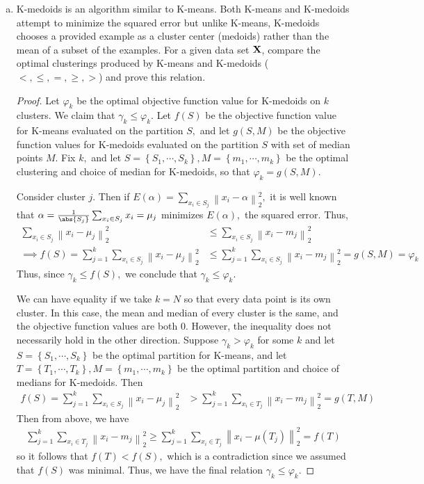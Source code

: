 \documentclass{article}
\newcommand{\X}{{\bf X}}
\begin{document}
\begin{enumerate}[(a)]
		\item K-medoids is an algorithm similar to K-means. Both K-means and K-medoids attempt to minimize the squared error but unlike K-means, K-medoids chooses a provided example as a cluster center (medoids) rather than the mean of a subset of the examples. For a given data set $\X$, compare the optimal clusterings produced by K-means and K-medoids ($<, \le, =, \ge, >$) and prove this relation.
			\begin{proof}
				Let $\varphi_k$ be the optimal objective function value for K-medoids on $k$ clusters. We claim that $\gamma_k\le \varphi_k.$ Let $f(S)$ be the objective function value for K-means evaluated on the partition $S,$ and let $g(S, M)$ be the objective function values for K-medoids evaluated on the partition $S$ with set of median points $M.$ Fix $k,$ and let $S=\left\{ S_1, \cdots, S_k \right\}, M=\left\{ m_1, \cdots, m_k \right\}$ be the optimal clustering and choice of median for K-medoids, so that $\varphi_k=g(S, M).$
				
				Consider cluster $j.$ Then if $E(\alpha) = \sum_{x_i\in S_j}^{} \left\lVert x_i-\alpha \right\rVert_2^2,$ it is well known that $\alpha=\frac{1}{\abs{S_j}}\sum_{x_i\in S_j}^{}x_i = \mu_j$ minimizes $E(\alpha),$ the squared error. Thus,
				\begin{align*}
					\sum_{x_i\in S_j}^{}\left\lVert x_i-\mu_j \right\rVert_2^2&\le \sum_{x_i\in S_j}^{}\left\lVert x_i-m_j \right\rVert_2^2 \\
					\implies f(S) = \sum_{j=1}^{k} \sum_{x_i\in S_j}^{}\left\lVert x_i-\mu_j \right\rVert_2^2 &\le \sum_{j=1}^{k} \sum_{x_i\in S_j}^{}\left\lVert x_i-m_j \right\rVert_2^2 = g(S, M) = \varphi_k
				\end{align*}
				Thus, since $\gamma_k\le f(S),$ we conclude that $\gamma_k\le \varphi_k.$

				We can have equality if we take $k=N$ so that every data point is its own cluster. In this case, the mean and median of every cluster is the same, and the objective function values are both 0. However, the inequality does not necessarily hold in the other direction. Suppose $\gamma_k>\varphi_k$ for some $k$ and let $S=\left\{ S_1, \cdots, S_k \right\}$ be the optimal partition for K-means, and let $T=\left\{ T_1, \cdots, T_k \right\}, M=\left\{ m_1, \cdots, m_k \right\}$ be the optimal partition and choice of medians for K-medoids. Then
				\begin{align*}
					f(S) = \sum_{j=1}^{k} \sum_{x_i\in S_j}^{} \left\lVert x_i-\mu_j \right\rVert_2^2 &> \sum_{j=1}^{k} \sum_{x_i\in T_j}^{}\left\lVert x_i-m_j \right\rVert_2^2 = g(T, M)
				\end{align*}
				Then from above, we have
				\begin{align*}
					\sum_{j=1}^{k} \sum_{x_i\in T_j}^{}\left\lVert x_i-m_j \right\rVert_2^2 \ge \sum_{j=1}^{k} \sum_{x_i\in T_j}^{}\left\lVert x_i - \mu(T_j) \right\rVert_2^2 = f(T)
				\end{align*}
				so it follows that $f(T) < f(S),$ which is a contradiction since we assumed that $f(S)$ was minimal. Thus, we have the final relation $\gamma_k\le \varphi_k.$
			\end{proof}


\end{enumerate}
\end{document}
